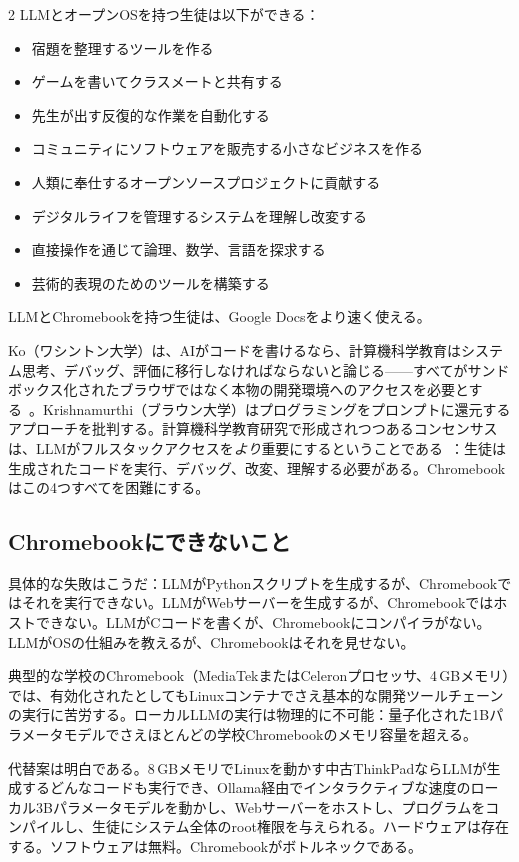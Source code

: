 \documentclass[11pt, a4paper]{article}
\begin{document}
\begin{multicols}{2}
LLMとオープンOSを持つ生徒は以下ができる：

\begin{itemize}
  \item 宿題を整理するツールを作る
  \item ゲームを書いてクラスメートと共有する
  \item 先生が出す反復的な作業を自動化する
  \item コミュニティにソフトウェアを販売する小さなビジネスを作る
  \item 人類に奉仕するオープンソースプロジェクトに貢献する
  \item デジタルライフを管理するシステムを理解し改変する
  \item 直接操作を通じて論理、数学、言語を探求する
  \item 芸術的表現のためのツールを構築する
\end{itemize}

LLMとChromebookを持つ生徒は、Google Docsをより速く使える。

Ko（ワシントン大学）は、AIがコードを書けるなら、計算機科学教育はシステム思考、デバッグ、評価に移行しなければならないと論じる——すべてがサンドボックス化されたブラウザではなく本物の開発環境へのアクセスを必要とする~\citep{denny2024computing}。Krishnamurthi（ブラウン大学）はプログラミングをプロンプトに還元するアプローチを批判する。計算機科学教育研究で形成されつつあるコンセンサスは、LLMがフルスタックアクセスを\emph{より}重要にするということである~\citep{prather2024robots}：生徒は生成されたコードを実行、デバッグ、改変、理解する必要がある。Chromebookはこの4つすべてを困難にする。

\subsection{Chromebookにできないこと}

具体的な失敗はこうだ：LLMがPythonスクリプトを生成するが、Chromebookではそれを実行できない。LLMがWebサーバーを生成するが、Chromebookではホストできない。LLMがCコードを書くが、Chromebookにコンパイラがない。LLMがOSの仕組みを教えるが、Chromebookはそれを見せない。

典型的な学校のChromebook（MediaTekまたはCeleronプロセッサ、4\,GBメモリ）では、有効化されたとしてもLinuxコンテナでさえ基本的な開発ツールチェーンの実行に苦労する。ローカルLLMの実行は物理的に不可能：量子化された1Bパラメータモデルでさえほとんどの学校Chromebookのメモリ容量を超える。

代替案は明白である。8\,GBメモリでLinuxを動かす中古ThinkPadならLLMが生成するどんなコードも実行でき、Ollama経由でインタラクティブな速度のローカル3Bパラメータモデルを動かし、Webサーバーをホストし、プログラムをコンパイルし、生徒にシステム全体のroot権限を与えられる。ハードウェアは存在する。ソフトウェアは無料。Chromebookがボトルネックである。


\end{multicols}
\end{document}
